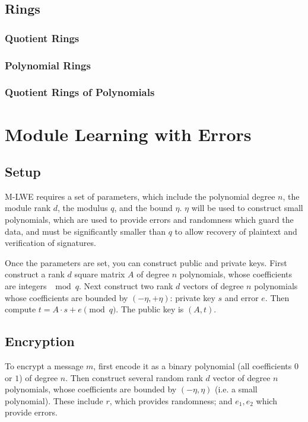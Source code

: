 \documentclass{article}
\begin{document}
\subsection{
  Rings
}

\subsubsection{
  Quotient Rings
}

\subsubsection{
  Polynomial Rings
}

\subsubsection{
  Quotient Rings of Polynomials
}

\newpage
\section{
  Module Learning with Errors
}

\subsection{
  Setup
}

M-LWE requires a set of parameters, which include the polynomial degree $n$, the module rank $d$, the modulus $q$, and the bound $\eta$.  $\eta$ will be used to construct small polynomials, which are used to provide errors and randomness which guard the data, and must be significantly smaller than $q$ to allow recovery of plaintext and verification of signatures.

Once the parameters are set, you can construct public and private keys.  First construct a rank $d$ square matrix $A$ of degree $n$ polynomials, whose coefficients are integers $\mod{q}$.  Next construct two rank $d$ vectors of degree $n$ polynomials whose coefficients are bounded by $(-\eta, +\eta)$: private key $s$ and error $e$.  Then compute $t = A \cdot s + e \pmod{q}$.  The public key is $(A, t)$.

\subsection{
  Encryption
}

To encrypt a message $m$, first encode it as a binary polynomial (all coefficients $0$ or $1$) of degree $n$.  Then construct several random rank $d$ vector of degree $n$ polynomials, whose coefficients are bounded by $(-\eta, \eta)$ (i.e. a small polynomial).  These include $r$, which provides randomness; and $e_1, e_2$ which provide errors.
\end{document}
